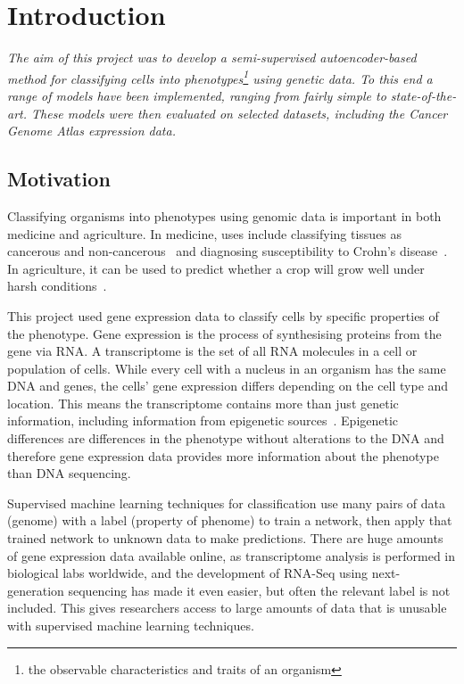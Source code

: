 \chapter{Introduction}

\textit{The aim of this project was to develop a semi-supervised autoencoder-based method for classifying 
cells into phenotypes\footnote{the observable characteristics and traits of an organism} using genetic data. To this end a range 
of models have been implemented, 
ranging from fairly simple to state-of-the-art. These models were then evaluated on selected datasets, including 
the Cancer Genome Atlas expression data.}

\section{Motivation}

Classifying organisms into phenotypes using genomic data is important in both medicine and agriculture. In medicine, uses include 
classifying tissues as cancerous and non-cancerous~\cite{Li2017} and diagnosing susceptibility to Crohn's disease~\cite{doi:10.1002/humu.23280}.
In agriculture, it can be used to predict whether a crop will grow well under harsh conditions~\cite{cimmyt}.

This project used gene expression data to classify cells by specific properties of the phenotype. Gene expression is the process of synthesising 
proteins from the gene via RNA. A transcriptome is the set of all RNA 
molecules in a cell or population of cells. While every cell with a nucleus in an organism has the same DNA and genes, the cells'
gene expression differs depending on the cell type and location. This means the
transcriptome contains more than just genetic information, including information from epigenetic sources~\cite{Gibney2010}. Epigenetic differences are differences
in the phenotype without alterations to the DNA and therefore gene expression data provides more information about 
the phenotype than DNA sequencing.

Supervised machine learning techniques for classification use many pairs of data (genome) with a label
(property of phenome) to train a network, then apply that trained network to unknown data to make predictions. 
There are huge amounts of gene expression data available online, as transcriptome analysis is performed in biological labs worldwide, 
and the development of RNA-Seq using next-generation sequencing has made it even easier, but often the relevant 
label is not included. This gives researchers access to large 
amounts of data that is unusable with supervised machine learning techniques.


